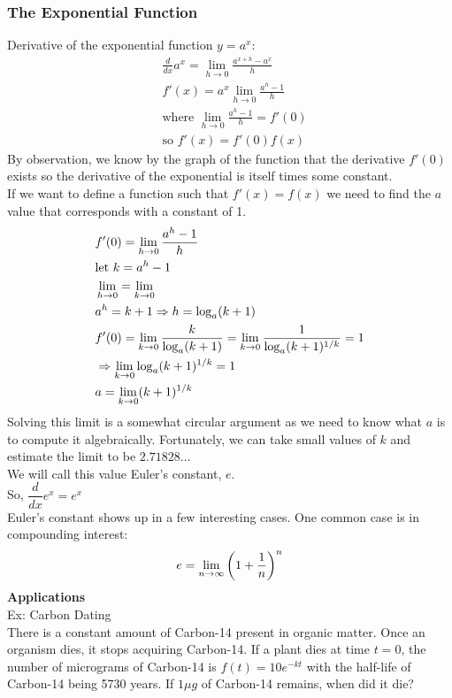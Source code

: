 \documentclass[11pt, fleqn]{article}
\begin{document}
\subsubsection{The Exponential Function}
Derivative of the exponential function $y=a^x$:
\begin{align*}
    &\frac{d}{dx}a^x=\lim_{h\to 0}\frac{a^{x+h}-a^x}{h}\\
    &f'(x)=a^x\lim_{h\to 0}\frac{a^h-1}{h}\\
    &\text{where }\lim_{h\to 0}\frac{a^h-1}{h}=f'(0)\\
    &\text{so }f'(x)=f'(0)f(x)
\end{align*}
By observation, we know by the graph of the function that the derivative $f'(0)$ exists so the derivative of the exponential is itself times some constant.\\
If we want to define a function such that $f'(x)=f(x)$ we need to find the $a$ value that corresponds with a constant of 1.
\begin{align*}
    &f'(0)=\lim_{h\to 0}\frac{a^h-1}{h}\\
    &\text{let }k=a^h-1\\
    &\lim_{h\to 0}=\lim_{k\to 0}\\
    &a^h=k+1\Rightarrow h=\log_a(k+1)\\
    &f'(0)=\lim_{k\to 0}\frac{k}{\log_a(k+1)}=\lim_{k\to 0}\frac{1}{\log_a(k+1)^{1/k}}=1\\
    &\Rightarrow\lim_{k\to 0}\log_a(k+1)^{1/k}=1\\
    &a=\lim_{k\to 0}(k+1)^{1/k}
\end{align*}
Solving this limit is a somewhat circular argument as we need to know what $a$ is to compute it algebraically. Fortunately, we can take small values of $k$ and estimate the limit to be $2.71828\ldots$\\
We will call this value Euler's constant, $e$.\\
So, $\dfrac{d}{dx}e^x=e^x$\\
Euler's constant shows up in a few interesting cases. One common case is in compounding interest:
$$e=\lim_{n\to \infty}\left( 1+\frac{1}{n} \right)^n$$
\textbf{Applications}\\
Ex: Carbon Dating\\
There is a constant amount of Carbon-14 present in organic matter. Once an organism dies, it stops acquiring Carbon-14. If a plant dies at time $t=0$, the number of micrograms of Carbon-14 is $f(t)=10e^{-kt}$ with the half-life of Carbon-14 being 5730 years. If $1\mu g$ of Carbon-14 remains, when did it die?
\end{document}

